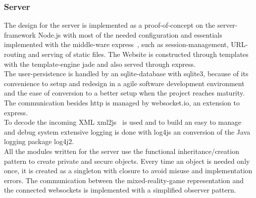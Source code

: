 \documentclass[journal]{IEEEtran}
\begin{document}
\subsubsection{Server}
The design for the server is implemented as a proof-of-concept on the
server-framework Node.js\cite{Node.js} with most of the needed configuration and
essentials implemented with the middle-ware express~\cite{express}, such as
session-management, URL-routing and serving of static files. The Website is
constructed through templates with the template-engine jade\cite{jade} and also served through express.\\
The user-persistence is handled by an sqlite-database with
sqlite3\cite{sqlite3}, because of its convenience to setup and redesign in a
agile software development environment\cite{agile_devel} and the ease of
conversion to a better setup when the project reaches maturity.\\
The communication besides http is managed by
websocket.io\cite{websocket.io}\cite{smash_node.js}, an extension to express.\\
To decode the incoming XML xml2js~\cite{xml2js} is used and to build an easy to
manage and debug system extensive logging is done with log4js\cite{log4js} an
conversion of the Java logging package log4j2\cite{log4j2}.\\
All the modules written for the server use the functional inheritance/creation
pattern\cite{js_goodparts} to create private and secure objects. Every time an
object is needed only once, it is created as a singleton with
closure\cite{js_designpattern} to avoid misuse and implementation errors. The
communication between the mixed-reality-game representation and the connected
websockets is implemented with a simplified observer
pattern\cite{js_designpattern}.\\[3mm]
\end{document}
